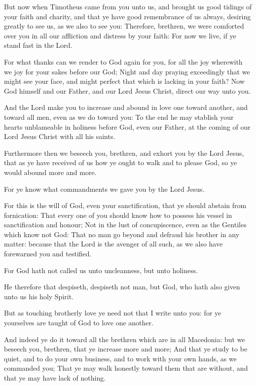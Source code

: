 \Verse But now when Timotheus came from you unto us, and brought us good tidings of your faith and charity, and that ye have good remembrance of us always, desiring greatly to see us, as we also to see you: \Verse Therefore, brethren, we were comforted over you in all our affliction and distress by your faith: \Verse For now we live, if ye stand fast in the Lord.

\Verse For what thanks can we render to God again for you, for all the joy wherewith we joy for your sakes before our God; \Verse Night and day praying exceedingly that we might see your face, and might perfect that which is lacking in your faith?  \Verse Now God himself and our Father, and our Lord Jesus Christ, direct our way unto you.

\Verse And the Lord make you to increase and abound in love one toward another, and toward all men, even as we do toward you: \Verse To the end he may stablish your hearts unblameable in holiness before God, even our Father, at the coming of our Lord Jesus Christ with all his saints.


\Chapter
\Verse Furthermore then we beseech you, brethren, and exhort you by the Lord Jesus, that as ye have received of us how ye ought to walk and to please God, so ye would abound more and more.

\Verse For ye know what commandments we gave you by the Lord Jesus.

\Verse For this is the will of God, even your sanctification, that ye should abstain from fornication: \Verse That every one of you should know how to possess his vessel in sanctification and honour; \Verse Not in the lust of concupiscence, even as the Gentiles which know not God: \Verse That no man go beyond and defraud his brother in any matter: because that the Lord is the avenger of all such, as we also have forewarned you and testified.

\Verse For God hath not called us unto uncleanness, but unto holiness.

\Verse He therefore that despiseth, despiseth not man, but God, who hath also given unto us his holy Spirit.

\Verse But as touching brotherly love ye need not that I write unto you: for ye yourselves are taught of God to love one another.

\Verse And indeed ye do it toward all the brethren which are in all Macedonia: but we beseech you, brethren, that ye increase more and more; \Verse And that ye study to be quiet, and to do your own business, and to work with your own hands, as we commanded you; \Verse That ye may walk honestly toward them that are without, and that ye may have lack of nothing.

